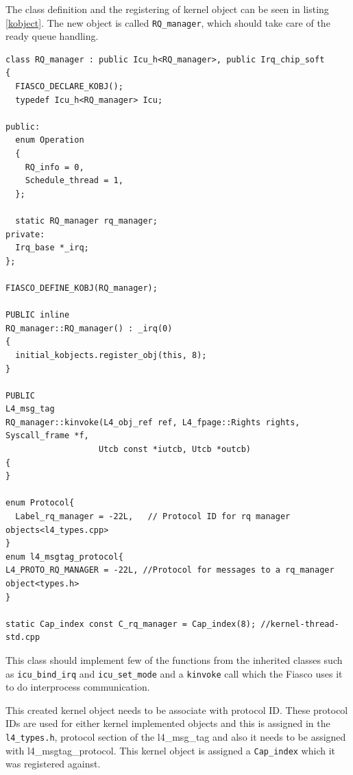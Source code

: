 The class definition and the registering of kernel object can be seen in listing \ref{kobject}. The new object is called \texttt{RQ\_manager}, which should take care of the ready queue handling.

\begin{lstlisting}[caption={Creating new kernel object},label=kobject, style=customcpp]
class RQ_manager : public Icu_h<RQ_manager>, public Irq_chip_soft
{
  FIASCO_DECLARE_KOBJ();
  typedef Icu_h<RQ_manager> Icu;

public:
  enum Operation
  {
	RQ_info = 0,
	Schedule_thread = 1,
  };

  static RQ_manager rq_manager;
private:
  Irq_base *_irq;
};

FIASCO_DEFINE_KOBJ(RQ_manager);

PUBLIC inline
RQ_manager::RQ_manager() : _irq(0)
{
  initial_kobjects.register_obj(this, 8);
}

PUBLIC
L4_msg_tag
RQ_manager::kinvoke(L4_obj_ref ref, L4_fpage::Rights rights, Syscall_frame *f,
                   Utcb const *iutcb, Utcb *outcb)
{
}

enum Protocol{
  Label_rq_manager = -22L,   // Protocol ID for rq manager objects<l4_types.cpp>
}
enum l4_msgtag_protocol{
L4_PROTO_RQ_MANAGER = -22L, //Protocol for messages to a rq_manager object<types.h>
}

static Cap_index const C_rq_manager = Cap_index(8); //kernel-thread-std.cpp
\end{lstlisting}

This class should implement few of the functions from the inherited classes such as \texttt{icu\_bind\_irq} and \texttt{icu\_set\_mode} and a \texttt{kinvoke} call which the Fiasco uses it to do interprocess communication.

This created kernel object needs to be associate with protocol ID. These protocol IDs are used for either
kernel implemented objects and this is assigned in the \texttt{l4\_types.h}, protocol section of the
l4\_msg\_tag and also it needs to be assigned with l4\_msgtag\_protocol. This kernel object is assigned a \texttt{Cap\_index} which it was registered against.